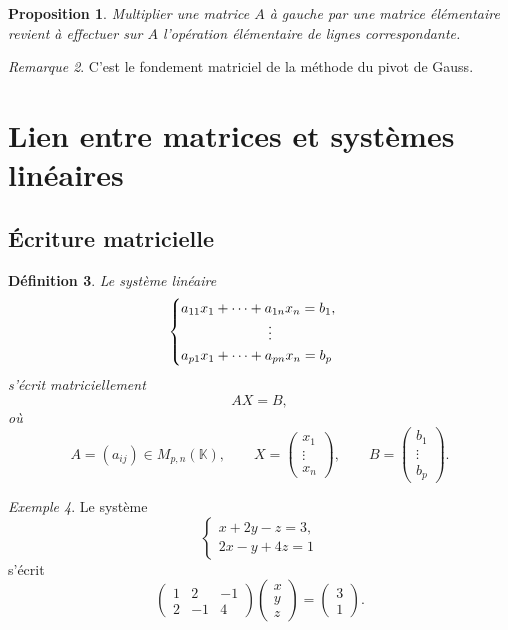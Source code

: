 \documentclass[11pt,a4paper]{article}
\newtheorem{definition}{Définition}[section]
\newtheorem{proposition}[definition]{Proposition}
\theoremstyle{remark}
\newtheorem{remarque}[definition]{Remarque}
\newtheorem{exemple}[definition]{Exemple}
\newcommand{\K}{\mathbb{K}}
\begin{document}
\begin{proposition}
Multiplier une matrice \(A\) à gauche par une matrice élémentaire revient à effectuer sur \(A\) l’opération élémentaire de lignes correspondante.
\end{proposition}

\begin{remarque}
C’est le fondement matriciel de la méthode du pivot de Gauss.
\end{remarque}

\section{Lien entre matrices et systèmes linéaires}

\subsection{Écriture matricielle}

\begin{definition}
Le système linéaire
\[
\begin{cases}
a_{11}x_1+\cdots+a_{1n}x_n=b_1,\\
\hspace{2.2cm}\vdots\\
a_{p1}x_1+\cdots+a_{pn}x_n=b_p
\end{cases}
\]
s’écrit matriciellement
\[
AX=B,
\]
où
\[
A=(a_{ij})\in M_{p,n}(\K),
\qquad
X=
\begin{pmatrix}
x_1\\
\vdots\\
x_n
\end{pmatrix},
\qquad
B=
\begin{pmatrix}
b_1\\
\vdots\\
b_p
\end{pmatrix}.
\]
\end{definition}

\begin{exemple}
Le système
\[
\begin{cases}
x+2y-z=3,\\
2x-y+4z=1
\end{cases}
\]
s’écrit
\[
\begin{pmatrix}
1 & 2 & -1\\
2 & -1 & 4
\end{pmatrix}
\begin{pmatrix}
x\\
y\\
z
\end{pmatrix}
=
\begin{pmatrix}
3\\
1
\end{pmatrix}.
\]
\end{exemple}
\end{document}
